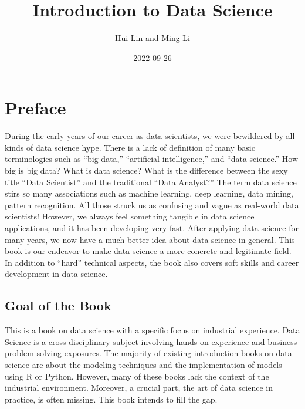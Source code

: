 \documentclass[
  12pt,
]{krantz}
\title{Introduction to Data Science}
\author{Hui Lin and Ming Li}
\date{2022-09-26}
\begin{document}
\maketitle

\thispagestyle{empty}
\begin{center}
\end{center}

\setlength{\abovedisplayskip}{-5pt}
\setlength{\abovedisplayshortskip}{-5pt}

{
\hypersetup{linkcolor=}
\setcounter{tocdepth}{2}
\tableofcontents
}
\listoffigures
\listoftables
\hypertarget{preface}{%
\chapter*{Preface}\label{preface}}


During the early years of our career as data scientists, we were bewildered by all kinds of data science hype. There is a lack of definition of many basic terminologies such as ``big data,'' ``artificial intelligence,'' and ``data science.'' How big is big data? What is data science? What is the difference between the sexy title ``Data Scientist'' and the traditional ``Data Analyst?'' The term data science stirs so many associations such as machine learning, deep learning, data mining, pattern recognition. All those struck us as confusing and vague as real-world data scientists! However, we always feel something tangible in data science applications, and it has been developing very fast. After applying data science for many years, we now have a much better idea about data science in general. This book is our endeavor to make data science a more concrete and legitimate field. In addition to ``hard'' technical aspects, the book also covers soft skills and career development in data science.

\hypertarget{goal-of-the-book}{%
\section*{Goal of the Book}\label{goal-of-the-book}}


This is a book on data science with a specific focus on industrial experience. Data Science is a cross-disciplinary subject involving hands-on experience and business problem-solving exposures. The majority of existing introduction books on data science are about the modeling techniques and the implementation of models using R or Python. However, many of these books lack the context of the industrial environment. Moreover, a crucial part, the art of data science in practice, is often missing. This book intends to fill the gap.
\end{document}
